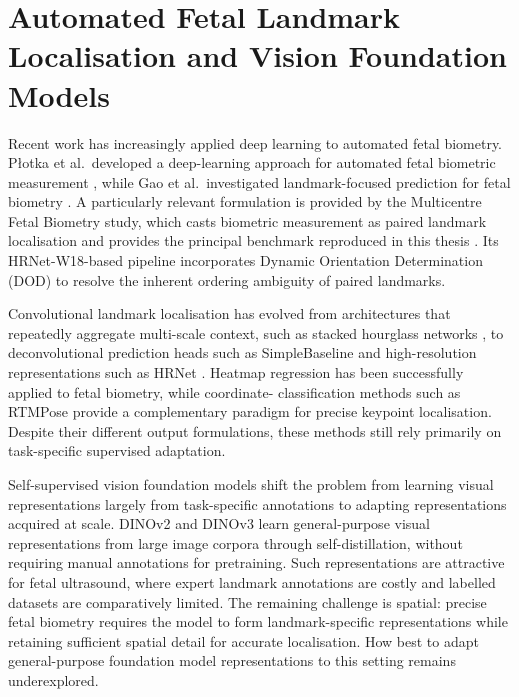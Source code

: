 
\section{Automated Fetal Landmark Localisation and Vision Foundation
Models}
\label{sec:intro-gap}

Recent work has increasingly applied deep learning to automated fetal
biometry. P{\l}otka et al.\ developed a deep-learning approach for
automated fetal biometric measurement
\parencite{plotka2022fuvai}, while Gao et al.\ investigated
landmark-focused prediction for fetal biometry
\parencite{gao2023endpoints}. A particularly relevant formulation is
provided by the Multicentre Fetal Biometry study, which casts
biometric measurement as paired landmark localisation and provides
the principal benchmark reproduced in this thesis
\parencite{divece2025multicentre}. Its HRNet-W18-based pipeline
incorporates Dynamic Orientation Determination (DOD) to resolve the
inherent ordering ambiguity of paired landmarks.

Convolutional landmark localisation has evolved from architectures
that repeatedly aggregate multi-scale context, such as stacked
hourglass networks \parencite{newell2016hourglass}, to
deconvolutional prediction heads such as SimpleBaseline
\parencite{xiao2018simple} and high-resolution representations such
as HRNet \parencite{sun2019hrnet}. Heatmap regression has been
successfully applied to fetal biometry, while coordinate-
classification methods such as RTMPose
\parencite{jiang2023rtmpose} provide a complementary paradigm for
precise keypoint localisation. Despite their different output
formulations, these methods still rely primarily on task-specific
supervised adaptation.

Self-supervised vision foundation models shift the problem from
learning visual representations largely from task-specific
annotations to adapting representations acquired at scale. DINOv2
\parencite{oquab2023dinov2} and DINOv3
\parencite{simeoni2025dinov3} learn general-purpose visual
representations from large image corpora through self-distillation,
without requiring manual annotations for pretraining. Such
representations are attractive for fetal ultrasound, where expert
landmark annotations are costly and labelled datasets are
comparatively limited. The remaining challenge is spatial: precise
fetal biometry requires the model to form landmark-specific
representations while retaining sufficient spatial detail for
accurate localisation. How best to adapt general-purpose foundation
model representations to this setting remains underexplored.


